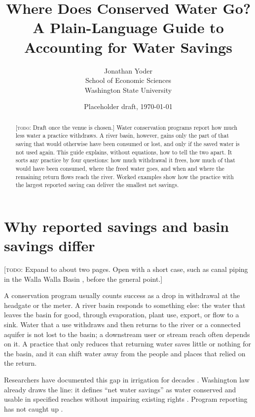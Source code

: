 \documentclass[11pt]{article}
\title{Where Does Conserved Water Go?\\[2pt]\large A Plain-Language Guide to Accounting for Water Savings}
\author{Jonathan Yoder\\School of Economic Sciences\\Washington State University}
\date{Placeholder draft, \today}
\newcommand{\todo}[1]{\textcolor{orange!70!black}{[\textsc{todo}: #1]}}
\begin{document}
\maketitle

\begin{abstract}
\todo{Draft once the venue is chosen.} Water conservation programs report how much less water a practice withdraws. A river basin, however, gains only the part of that saving that would otherwise have been consumed or lost, and only if the saved water is not used again. This guide explains, without equations, how to tell the two apart. It sorts any practice by four questions: how much withdrawal it frees, how much of that would have been consumed, where the freed water goes, and when and where the remaining return flows reach the river. Worked examples show how the practice with the largest reported saving can deliver the smallest net savings.
\end{abstract}

\section{Why reported savings and basin savings differ}\label{sec:why}

\todo{Expand to about two pages. Open with a short case, such as canal piping in the Walla Walla Basin \citep{scherberg2018}, before the general point.}

A conservation program usually counts success as a drop in withdrawal at the headgate or the meter. A river basin responds to something else: the water that leaves the basin for good, through evaporation, plant use, export, or flow to a sink. Water that a use withdraws and then returns to the river or a connected aquifer is not lost to the basin; a downstream user or stream reach often depends on it. A practice that only reduces that returning water saves little or nothing for the basin, and it can shift water away from the people and places that relied on the return.

Researchers have documented this gap in irrigation for decades \citep{seckler1996,ward2008,pfeiffer2014,grafton2018}. Washington law already draws the line: it defines ``net water savings'' as water conserved and usable in specified reaches without impairing existing rights \citep{rcw9042020}. Program reporting has not caught up \citep{wadraft2026}.
\end{document}
